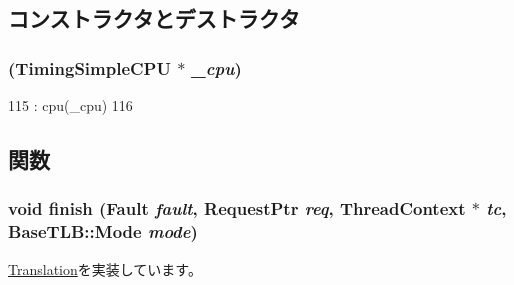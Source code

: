 \subsection{コンストラクタとデストラクタ}
\hypertarget{classTimingSimpleCPU_1_1FetchTranslation_a03b971fd63881d33f972ba3f025fb520}{
\subsubsection[{FetchTranslation}]{ ({\bf TimingSimpleCPU} $\ast$ {\em \_\-cpu})}}
\label{classTimingSimpleCPU_1_1FetchTranslation_a03b971fd63881d33f972ba3f025fb520}



\begin{DoxyCode}
115             : cpu(_cpu)
116         {}
\end{DoxyCode}


\subsection{関数}
\hypertarget{classTimingSimpleCPU_1_1FetchTranslation_a01e7d945def8d2e5df87a169954fa89f}{
\subsubsection[{finish}]{\setlength{\rightskip}{0pt plus 5cm}void finish ({\bf Fault} {\em fault}, \/  {\bf RequestPtr} {\em req}, \/  {\bf ThreadContext} $\ast$ {\em tc}, \/  {\bf BaseTLB::Mode} {\em mode})}}
\label{classTimingSimpleCPU_1_1FetchTranslation_a01e7d945def8d2e5df87a169954fa89f}


\hyperlink{classBaseTLB_1_1Translation_a5698e0a932f298729d10355d4384e565}{Translation}を実装しています。


